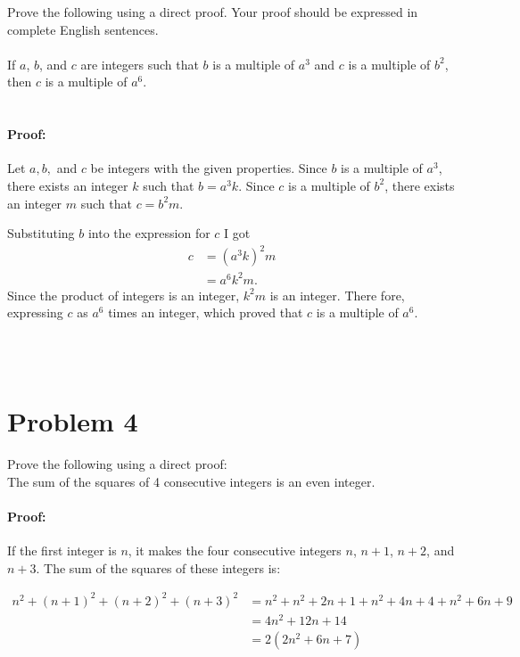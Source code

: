 \documentclass{amsart}
\theoremstyle{definition}
\theoremstyle{Exercise}
\theoremstyle{remark}
\theoremstyle{rule}
\numberwithin{equation}{section}
\begin{document}
Prove the following using a direct proof. Your proof should be expressed in complete English sentences.
\\\\

If $a$, $b$, and $c$ are integers such that $b$ is a multiple of $a^3$ and $c$ is a multiple of $b^2$, then $c$ is a multiple of $a^6$.
\\\\
\paragraph{Proof:} Let \( a, b, \) and \( c \) be integers with the given properties. Since \( b \) is a multiple of \( a^3 \), there exists an integer \( k \) such that \( b = a^3k \). Since \( c \) is a multiple of \( b^2 \), there exists an integer \( m \) such that \( c = b^2m \).

Substituting \( b \) into the expression for \( c \) I got
\begin{align*}
c &= (a^3k)^2m \\
  &= a^6k^2m.
\end{align*}
Since the product of integers is an integer, \( k^2m \) is an integer. There fore, expressing \( c \) as \( a^6 \) times an integer, which proved that \( c \) is a multiple of \( a^6 \).

\\\\

 \newpage
\section*{Problem 4}
Prove the following using a direct proof:
\\

The sum of the squares of 4 consecutive integers is an even integer.
\paragraph{Proof:} If the first integer is \(n\), it makes the four consecutive integers \(n\), \(n+1\), \(n+2\), and \(n+3\). The sum of the squares of these integers is:

\begin{align*}
n^2 + (n+1)^2 + (n+2)^2 + (n+3)^2 &= n^2 + n^2 + 2n + 1 + n^2 + 4n + 4 + n^2 + 6n + 9 \\
&= 4n^2 + 12n + 14 \\
&= 2(2n^2 + 6n + 7)
\end{align*}
\end{document}
